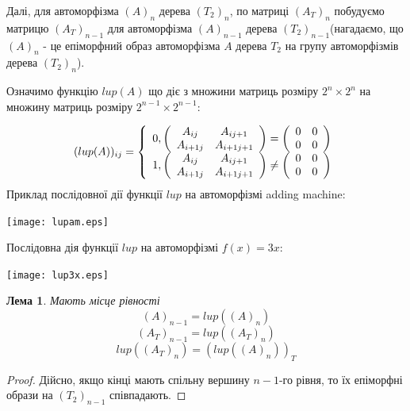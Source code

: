\documentclass[a4paper,12pt]{article} \usepackage{a4wide}
\numberwithin{equation}{subsection}
\newtheorem{lemma}{Лема}[subsection]
\begin{document}
  Далі, для автоморфізма $(A)_n$ дерева $(T_2)_n$, по матриці $(A_T)_n$  побудуємо матрицю $(A_T)_{n-1}$ для автоморфізма $(A)_{n-1}$ дерева $(T_2)_{n-1}$(нагадаємо, що $(A)_n$ - це епіморфний образ автоморфізма $A$ дерева $T_2$ на групу автоморфізмів дерева $(T_2)_n$).

 Означимо функцію $lup(A)$
що діє з множини матриць розміру $2^n\times 2^n$ на множину матриць розміру $2^{n-1}\times 2^{n-1}$:

\[
(lup(A))_{ij}  = \left\{ \begin{array}{l}
 0,\left( {\begin{array}{*{20}c}
   {A_{ij} } & {A_{ij + 1} }  \\
   {A_{i + 1j} } & {A_{i + 1j + 1} }  \\
\end{array}} \right) = \left( {\begin{array}{*{20}c}
   0 & 0  \\
   0 & 0  \\
\end{array}} \right) \\
 1,\left( {\begin{array}{*{20}c}
   {A_{ij} } & {A_{ij + 1} }  \\
   {A_{i + 1j} } & {A_{i + 1j + 1} }  \\
\end{array}} \right) \ne \left( {\begin{array}{*{20}c}
   0 & 0  \\
   0 & 0  \\
\end{array}} \right) \\
 \end{array} \right.
\]
 Приклад послідовної дії функції $lup$ на автоморфізмі adding machine:
 \begin{center}
\texttt{[image: lupam.eps]}
\end{center}
Послідовна дія функції $lup$ на автоморфізмі $f(x)=3x$:
\begin{center}
\texttt{[image: lup3x.eps]}
\end{center}

\begin{lemma}
Мають місце рівності $$(A)_{n-1}=lup((A)_n)$$ $$(A_T)_{n-1}=lup((A_T)_n)$$ $$lup((A_T)_n)=(lup((A)_n))_T$$
\end{lemma}
\begin{proof}
Дійсно, якщо кінці мають спільну вершину $n-1$-го рівня, то їх епіморфні образи на $(T_2)_{n-1}$ співпадають.
\end{proof}
\end{document}
